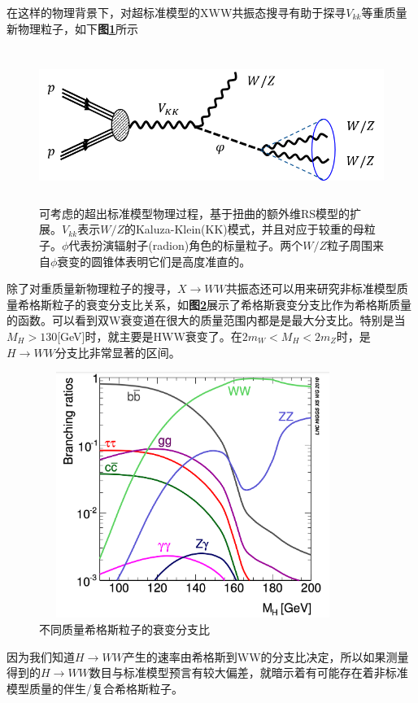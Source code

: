 在这样的物理背景下，对超标准模型的XWW共振态搜寻有助于探寻$V_{kk}$等重质量新物理粒子，如下\textbf{图\ref{fig:2.7}}所示
\begin{figure}[H]
 \centering
 \includegraphics[height=5cm, width=16cm]{pictures/Vkk.png}
  \caption{可考虑的超出标准模型物理过程，基于扭曲的额外维RS模型的扩展。$V_{kk}$表示$W/Z$的Kaluza-Klein(KK)模式，并且对应于较重的母粒子。$\phi$代表扮演辐射子(radion)角色的标量粒子。两个$W/Z$粒子周围来自$\phi$衰变的圆锥体表明它们是高度准直的。\cite{Detecting_a_Boosted_Diboson_Resonance}}
 \label{fig:2.7}
\end{figure}

除了对重质量新物理粒子的搜寻，$X\to WW$共振态还可以用来研究非标准模型质量希格斯粒子的衰变分支比关系，如\textbf{图\ref{fig:2.8}}展示了希格斯衰变分支比作为希格斯质量的函数。可以看到双W衰变道在很大的质量范围内都是是最大分支比。特别是当$M_H>130$[GeV]时，就主要是HWW衰变了。在$2m_W<M_H<2m_Z$时，是$H\to WW$分支比非常显著的区间。
\begin{figure}[H]
 \centering
 \includegraphics[height=8cm, width=10cm]{pictures/XS-MH.png}
  \caption{不同质量希格斯粒子的衰变分支比\cite{john-alison}}
 \label{fig:2.8}
\end{figure}
因为我们知道$H\to WW$产⽣的速率由希格斯到WW的分⽀⽐决定，所以如果测量得到的$H\to WW$数目与标准模型预言有较大偏差，就暗示着有可能存在着非标准模型质量的伴生/复合希格斯粒子。


